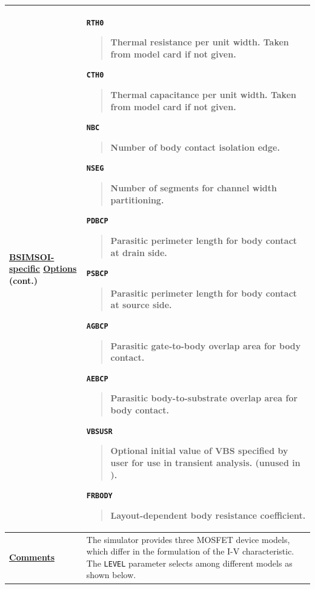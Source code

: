 \begin{longtable}[Hh]{>{\setlength{\hsize}{.4\hsize}}YY}
\\ \hline 
\underline{\bf BSIMSOI-specific} \underline{\bf Options} {\bf (cont.)} &

\texttt{RTH0}
\begin{quote}
Thermal resistance per unit width.  Taken from model card if not given.
\end{quote}

\texttt{CTH0}
\begin{quote}
Thermal capacitance per unit width.  Taken from model card if not given.
\end{quote}

\texttt{NBC}
\begin{quote}
Number of body contact isolation edge.
\end{quote}

\texttt{NSEG}
\begin{quote}
Number of segments for channel width partitioning.
\end{quote}

\texttt{PDBCP}
\begin{quote}
Parasitic perimeter length for body contact at drain side.
\end{quote}

\texttt{PSBCP}
\begin{quote}
Parasitic perimeter length for body contact at source side.
\end{quote}

\texttt{AGBCP}
\begin{quote}
Parasitic gate-to-body overlap area for body contact.
\end{quote}

\texttt{AEBCP}
\begin{quote}
Parasitic body-to-substrate overlap area for body contact.
\end{quote}

\texttt{VBSUSR}
\begin{quote}
Optional initial value of VBS specified by user for use in transient analysis.
(unused in \Xyce{}).
\end{quote}

\texttt{FRBODY}
\begin{quote}
Layout-dependent body resistance coefficient.
\end{quote}

\\ \hline

\underline{\bf Comments} & The simulator provides three MOSFET device models,
which differ in the formulation of the I-V characteristic. The \texttt{LEVEL}
parameter selects among different models as shown below.
\\ \hline
\end{longtable}

\addtocounter{table}{-1}


